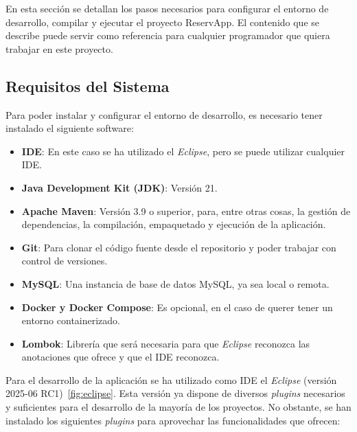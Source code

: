 En esta sección se detallan los pasos necesarios para configurar el entorno de desarrollo, compilar y ejecutar el proyecto ReservApp. El contenido que se describe puede servir como referencia para cualquier programador que quiera trabajar en este proyecto.

\subsection{Requisitos del Sistema}
Para poder instalar y configurar el entorno de desarrollo, es necesario tener instalado el siguiente software:
\begin{itemize}
   \item \textbf{IDE}: En este caso se ha utilizado el \textit{Eclipse}, pero se puede utilizar cualquier IDE.
   \item \textbf{Java Development Kit (JDK)}: Versión 21.
   \item \textbf{Apache Maven}: Versión 3.9 o superior, para, entre otras cosas, la gestión de dependencias, la compilación, empaquetado y ejecución de la aplicación.
   \item \textbf{Git}: Para clonar el código fuente desde el repositorio y poder trabajar con control de versiones.
   \item \textbf{MySQL}: Una instancia de base de datos MySQL, ya sea local o remota.
   \item \textbf{Docker y Docker Compose}: Es opcional, en el caso de querer tener un entorno containerizado.
   \item \textbf{Lombok}: Librería que será necesaria para que \textit{Eclipse} reconozca las anotaciones que ofrece y que el IDE reconozca.
\end{itemize}


Para el desarrollo de la aplicación se ha utilizado como IDE el \textit{Eclipse} (versión 2025-06 RC1)~\ref{fig:eclipse}. Esta versión ya dispone de diversos \emph{plugins} necesarios y suficientes para el desarrollo de la mayoría de los proyectos. No obstante, se han instalado los siguientes \emph{plugins} para aprovechar las funcionalidades que ofrecen:

